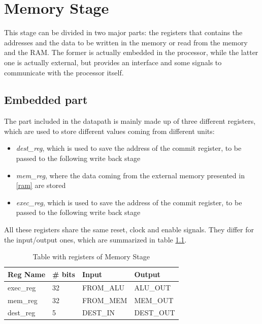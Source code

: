 \chapter{Memory Stage}
\label{chap_mem}
This stage can be divided in two major parts: the registers that contains the addresses and the data to be written in the memory or read from the memory and the RAM. The former is actually embedded in the processor, while the latter one is actually external, but provides an interface and some signals to communicate with the processor itself. 
\section{Embedded part}
The part included in the datapath is mainly made up of three different registers, which are used to store different values coming from different units:
\begin{itemize}
	\item \textit{dest\_reg}, which is used to save the address of the commit register, to be passed to the following write back stage
	\item \textit{mem\_reg}, where the data coming from the external memory presented in \ref{ram} are stored 
	\item \textit{exec\_reg}, which is used to save the address of the commit register, to be passed to the following write back stage
\end{itemize}
All these registers share the same reset, clock and enable signals. They differ for the input/output ones, which are summarized in table \ref{reg_table}.

\begin{table}[]
	\centering
	\begin{tabular}{llll}
		\toprule
		Reg Name  & \#  bits & Input     & Output   \\
		\midrule
		exec\_reg & 32       & FROM\_ALU & ALU\_OUT  \\
		mem\_reg  & 32       & FROM\_MEM & MEM\_OUT  \\
		dest\_reg & 5        & DEST\_IN  & DEST\_OUT \\
		\bottomrule
	\end{tabular}
	\caption{Table with registers of Memory Stage}
	\label{reg_table}
\end{table}

